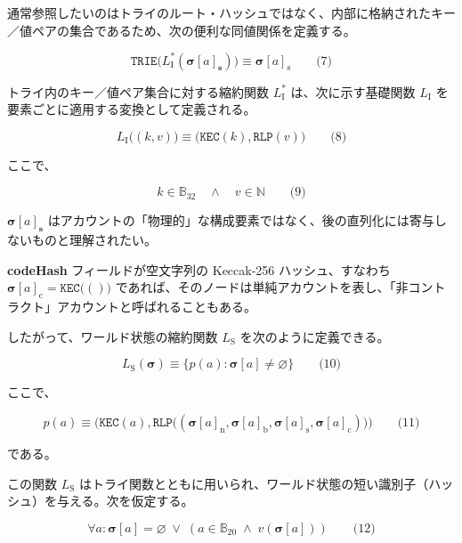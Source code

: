 \documentclass[
]{ltjsarticle}
\begin{document}
通常参照したいのはトライのルート・ハッシュではなく、内部に格納されたキー／値ペアの集合であるため、次の便利な同値関係を定義する。

\protect\hypertarget{eq-7}{}{}

\[\texttt{TRIE}\big(L_{\mathrm{I}}^{*}(\boldsymbol{\sigma}[a]_{\mathbf{s}})\big) \equiv \boldsymbol{\sigma}[a]_{\mathrm{s}} \qquad \text{(7)}\]

トライ内のキー／値ペア集合に対する縮約関数 \(L_{\mathrm{I}}^{*}\)
は、次に示す基礎関数 \(L_{\mathrm{I}}\)
を要素ごとに適用する変換として定義される。

\protect\hypertarget{eq-8}{}{}

\[L_{\mathrm{I}}\big( (k, v) \big) \equiv \big(\texttt{KEC}(k), \texttt{RLP}(v)\big) \qquad \text{(8)}\]

ここで、

\protect\hypertarget{eq-9}{}{}

\[k \in \mathbb{B}_{32} \quad \wedge \quad v \in \mathbb{N} \qquad \text{(9)}\]

\(\boldsymbol{\sigma}[a]_{\mathbf{s}}\)
はアカウントの「物理的」な構成要素ではなく、後の直列化には寄与しないものと理解されたい。

\textbf{codeHash} フィールドが空文字列の Keccak-256 ハッシュ、すなわち
\(\boldsymbol{\sigma}[a]_{\mathrm{c}} = \texttt{KEC}\big(()\big)\)
であれば、そのノードは単純アカウントを表し、「非コントラクト」アカウントと呼ばれることもある。

したがって、ワールド状態の縮約関数 \(L_{\mathrm{S}}\)
を次のように定義できる。

\protect\hypertarget{eq-10}{}{}

\[L_{\mathrm{S}}(\boldsymbol{\sigma}) \equiv \{ p(a): \boldsymbol{\sigma}[a] \neq \varnothing \} \qquad \text{(10)}\]

ここで、

\protect\hypertarget{eq-11}{}{}

\[p(a) \equiv  \big(\texttt{KEC}(a), \texttt{RLP}\big( (\boldsymbol{\sigma}[a]_{\mathrm{n}}, \boldsymbol{\sigma}[a]_{\mathrm{b}}, \boldsymbol{\sigma}[a]_{\mathrm{s}}, \boldsymbol{\sigma}[a]_{\mathrm{c}}) \big) \big) \qquad \text{(11)}\]

である。

この関数 \(L_{\mathrm{S}}\)
はトライ関数とともに用いられ、ワールド状態の短い識別子（ハッシュ）を与える。次を仮定する。

\protect\hypertarget{eq-12}{}{}

\[\forall a: \boldsymbol{\sigma}[a] = \varnothing \; \vee \; (a \in \mathbb{B}_{20} \; \wedge \; v(\boldsymbol{\sigma}[a])) \qquad \text{(12)}\]
\end{document}
